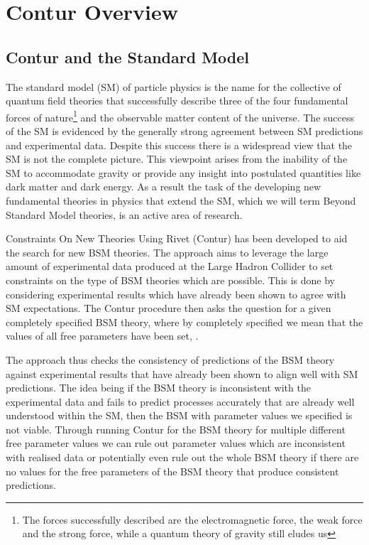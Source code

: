 \chapter{Contur Overview}
\label{chapterlabel2}

\section{Contur and the Standard Model}
The standard model (SM) of particle physics is the name for the collective of quantum field theories that successfully describe three of the four fundamental forces of nature\footnote{The forces successfully described are the electromagnetic force, the weak force and the strong force, while a quantum theory of gravity still eludes us} and the observable matter content of the universe. The success of the SM is evidenced by the generally strong agreement between SM predictions and experimental data. Despite this success there is a widespread view that the SM is not the complete picture. This viewpoint arises from the inability of the SM to accommodate gravity or provide any insight into postulated quantities like dark matter and dark energy. As a result the task of the developing new fundamental theories in physics that extend the SM, which we will term Beyond Standard Model theories, is an active area of research.

Constraints On New Theories Using Rivet (Contur) has been developed to aid the search for new BSM theories. The approach aims to leverage the large amount of experimental data produced at the Large Hadron Collider to set constraints on the type of BSM theories which are possible. This is done by considering experimental results which have already been shown to agree with SM expectations. The Contur procedure then asks  the question for a given completely specified BSM theory, where by completely specified we mean that the values of all free parameters have been set, . 

The approach thus checks the consistency of predictions of the BSM theory against experimental results that have already been shown to align well with SM predictions. The idea being if the BSM theory is inconsistent with the experimental data and fails to predict processes accurately that are already well understood within the SM, then the BSM with parameter values we specified is not viable. Through running Contur for the BSM theory for multiple different free parameter values we can rule out parameter values which are inconsistent with realised data or potentially even rule out the whole BSM theory if there are no values for the free parameters of the BSM theory that produce consistent predictions.


